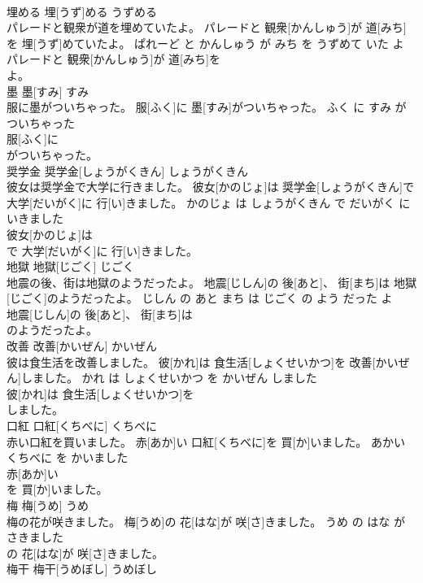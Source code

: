 \documentclass[8pt]{extreport}
\begin{document}
\begin{CJK}{UTF8}{min}
\\	埋める	埋[うず]める	うずめる	
\\	パレードと観衆が道を埋めていたよ。	パレードと 観衆[かんしゅう]が 道[みち]を 埋[うず]めていたよ。	ぱれーど と かんしゅう が みち を うずめて いた よ	
\\	パレードと 観衆[かんしゅう]が 道[みち]を
\\	よ。			
\\	墨	墨[すみ]	すみ	
\\	服に墨がついちゃった。	服[ふく]に 墨[すみ]がついちゃった。	ふく に すみ が ついちゃった	
\\	服[ふく]に
\\	がついちゃった。			
\\	奨学金	奨学金[しょうがくきん]	しょうがくきん	
\\	彼女は奨学金で大学に行きました。	彼女[かのじょ]は 奨学金[しょうがくきん]で 大学[だいがく]に 行[い]きました。	かのじょ は しょうがくきん で だいがく に いきました	
\\	彼女[かのじょ]は
\\	で 大学[だいがく]に 行[い]きました。			
\\	地獄	地獄[じごく]	じごく	
\\	地震の後、街は地獄のようだったよ。	地震[じしん]の 後[あと]、 街[まち]は 地獄[じごく]のようだったよ。	じしん の あと まち は じごく の よう だった よ	
\\	地震[じしん]の 後[あと]、 街[まち]は
\\	のようだったよ。			
\\	改善	改善[かいぜん]	かいぜん	
\\	彼は食生活を改善しました。	彼[かれ]は 食生活[しょくせいかつ]を 改善[かいぜん]しました。	かれ は しょくせいかつ を かいぜん しました	
\\	彼[かれ]は 食生活[しょくせいかつ]を
\\	しました。			
\\	口紅	口紅[くちべに]	くちべに	
\\	赤い口紅を買いました。	赤[あか]い 口紅[くちべに]を 買[か]いました。	あかい くちべに を かいました	
\\	赤[あか]い
\\	を 買[か]いました。			
\\	梅	梅[うめ]	うめ	
\\	梅の花が咲きました。	梅[うめ]の 花[はな]が 咲[さ]きました。	うめ の はな が さきました	
\\	の 花[はな]が 咲[さ]きました。			
\\	梅干	梅干[うめぼし]	うめぼし	

\end{CJK}
\end{document}
